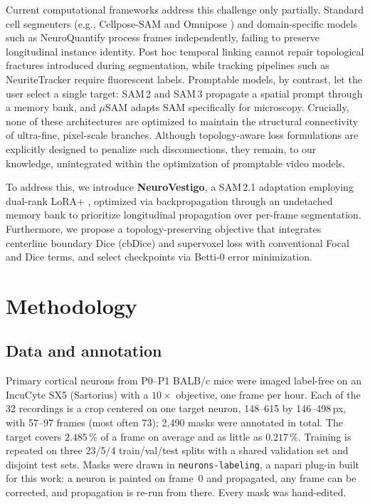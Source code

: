 \documentclass{article}
\begin{document}
Current computational frameworks address this challenge only partially. Standard cell segmenters (e.g., Cellpose-SAM \cite{pachitariu2025cellposesam} and Omnipose \cite{cutler2022omnipose}) and domain-specific models such as NeuroQuantify \cite{dang2024neuroquantify} process frames independently, failing to preserve longitudinal instance identity. Post hoc temporal linking \cite{maska2023ctc,gallusser2024trackastra} cannot repair topological fractures introduced during segmentation, while tracking pipelines such as NeuriteTracker \cite{fusco2016neuritetracker} require fluorescent labels. Promptable models, by contrast, let the user select a single target: SAM\,2 \cite{ravi2025sam2} and SAM\,3 \cite{carion2025sam3} propagate a spatial prompt through a memory bank, and $\mu$SAM \cite{archit2025microsam} adapts SAM \cite{kirillov2023sam} specifically for microscopy. Crucially, none of these architectures are optimized to maintain the structural connectivity of ultra-fine, pixel-scale branches. Although topology-aware loss formulations \cite{shit2021cldice,shi2024cbdice,grim2025supervoxel} are explicitly designed to penalize such disconnections, they remain, to our knowledge, unintegrated within the optimization of promptable video models.

To address this, we introduce \textbf{NeuroVestigo}, a SAM\,2.1 \cite{ravi2025sam2} adaptation employing dual-rank LoRA+ \cite{hayou2024loraplus}, optimized via backpropagation through an undetached memory bank to prioritize longitudinal propagation over per-frame segmentation. Furthermore, we propose a topology-preserving objective that integrates centerline boundary Dice (cbDice) \cite{shi2024cbdice} and supervoxel loss \cite{grim2025supervoxel} with conventional Focal and Dice terms, and select checkpoints via Betti-0 error minimization.

\section{Methodology}
\label{sec:method}

\subsection{Data and annotation}
\label{sec:data}

Primary cortical neurons from P0--P1 BALB/c mice
\cite{berkovich2025neurite} were imaged label-free on an IncuCyte SX5
(Sartorius) with a $10\times$ objective, one frame per hour. Each of the 32 recordings is a crop
centered on one target neuron, 148--615 by 146--498\,px, with 57--97 frames (most often 73); 2{,}490 masks were
annotated in total. The target covers $2.485\,\%$ of a frame on
average and as little as $0.217\,\%$. Training is repeated on three 23/5/4 train/val/test splits with a shared validation set and disjoint test sets. Masks were drawn in \texttt{neurons-labeling}, a napari
plug-in built for this work: a neuron is painted on frame~0 and propagated,
any frame can be corrected, and propagation is re-run from there. Every mask was hand-edited.
\end{document}
